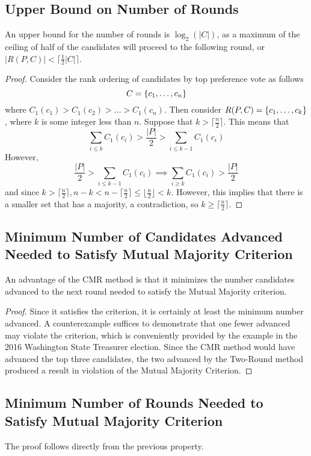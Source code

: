 \documentclass{article}
\begin{document}
\subsection{Upper Bound on Number of Rounds}
An upper bound for the number of rounds is $\log_2(|C|)$, as a maximum of the ceiling of half of the candidates will proceed to the following round, or $|R(P,C)| < \lceil\frac{1}{2} |C|\rceil$. 

\begin{proof}
Consider the rank ordering of candidates by top preference vote as follows
\[C = \qty{c_1, \dots, c_n}\]
where $C_1(c_1) > C_1(c_2) > \dots > C_1(c_n)$. Then consider $R(P,C) = \qty{c_1, \dots, c_k}$, where $k$ is some integer less than $n$. Suppose that $k > \lceil\frac{n}{2}\rceil$. This means that
\[\sum_{i\leq k} C_1(c_i) > \frac{|P|}{2} > \sum_{i\leq k-1} C_1(c_i)\]
However, \[\frac{|P|}{2} > \sum_{i\leq k-1} C_1(c_i) \implies \sum_{i\geq k} C_1(c_i)  > \frac{|P|}{2}\]
and since $k > \lceil\frac{n}{2}\rceil, n-k < n-\lceil\frac{n}{2}\rceil \leq \lfloor\frac{n}{2}\rfloor < k.$ However, this implies that there is a smaller set that has a majority, a contradiction, so $k \geq \lceil\frac{n}{2}\rceil$.
\end{proof}

\subsection{Minimum Number of Candidates Advanced Needed to Satisfy Mutual Majority Criterion}
An advantage of the CMR method is that it minimizes the number candidates advanced to the next round needed to satisfy the Mutual Majority criterion. 
\begin{proof}
Since it satisfies the criterion, it is certainly at least the minimum number advanced. A counterexample suffices to demonstrate that one fewer advanced may violate the criterion, which is conveniently provided by the example in the 2016 Washington State Treasurer election. Since the CMR method would have advanced the top three candidates, the two advanced by the Two-Round method produced a result in violation of the Mutual Majority Criterion.
\end{proof}
\subsection{Minimum Number of Rounds Needed to Satisfy Mutual Majority Criterion}
The proof follows directly from the previous property.
\end{document}
